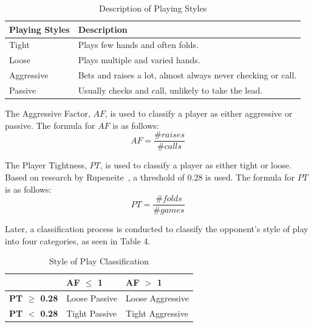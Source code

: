 \documentclass{article}
\begin{document}
\begin{table}[h!]
  \begin{center}
    \begin{tabular}{|l|p{5cm}|}
    \hline
      \textbf{Playing Styles} & \textbf{Description} \\
      \hline
      Tight & Plays few hands and often folds. \\
      \hline
      Loose & Plays multiple and varied hands.  \\
      \hline
      Aggressive &  Bets and raises a lot, almost always never checking or call. \\
      \hline
      Passive & Usually checks and call, unlikely to take the lead. \\
      \hline
    \end{tabular}
    \caption{Description of Playing Styles}
    \label{tab:table3}
  \end{center}
\end{table}

The Aggressive Factor, $AF$, is used to classify a player as either aggressive or passive. The formula for $AF$ is as follows:
\begin{displaymath}
  AF = \frac{\text{\# }raises}{\text{\# }calls}
\end{displaymath}

The Player Tightness, $PT$, is used to classify a player as either tight or loose. Based on research by Rupeneite~, a threshold of 0.28 is used. The formula for $PT$ is as follows:
\begin{displaymath}
  PT =  \frac{\text{\# }folds}{\text{\# }games} 
\end{displaymath}
 
Later, a classification process is conducted to classify the opponent's style of play into four categories, as seen in Table 4.

\begin{table}[h!]
  \begin{center}
    \begin{tabular}{p{1.5cm}|p{2cm}|p{2cm}}
      \textbf{} & \textbf{AF $\leq$ 1} & \textbf{AF $>$ 1} \\
      \hline
      \textbf{PT $\geq$ 0.28} & Loose \newline Passive & Loose \newline Aggressive \\
      \hline
      \textbf{PT $<$ 0.28} & Tight \newline Passive & Tight \newline Aggressive \\
    \end{tabular}
    \caption{Style of Play Classification}
    \label{tab:table4}
  \end{center}
\end{table}
\end{document}
